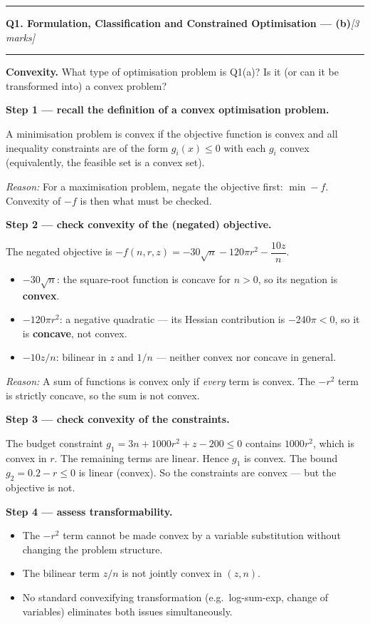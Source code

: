 \documentclass[10pt,a4paper]{article}
\newcommand{\sectitle}[2]{%
  \vspace{10pt}\noindent\rule{\linewidth}{0.8pt}\par\vspace{2pt}%
  {\large\textbf{#1}\hfill\normalsize\textit{[#2 marks]}}\par
  \vspace{2pt}\rule{\linewidth}{0.4pt}\vspace{4pt}}
\newcommand{\reason}[1]{%
  \begin{mdframed}[backgroundcolor=reasonbg, linewidth=0.4pt,
    innertopmargin=3pt, innerbottommargin=3pt,
    innerleftmargin=6pt, innerrightmargin=6pt]
    \small\textit{Reason:} \small #1
  \end{mdframed}\vspace{2pt}}
\begin{document}
\sectitle{Q1. Formulation, Classification and Constrained Optimisation --- (b)}{3}

\noindent\textbf{Convexity.} What type of optimisation problem is Q1(a)?
Is it (or can it be transformed into) a convex problem?

\vspace{6pt}
\textbf{Step 1 --- recall the definition of a convex optimisation problem.}

A minimisation problem is convex if the objective function is convex and
all inequality constraints are of the form $g_i(x)\le 0$ with each $g_i$
convex (equivalently, the feasible set is a convex set).

\reason{For a maximisation problem, negate the objective first: $\min -f$.
        Convexity of $-f$ is then what must be checked.}

\textbf{Step 2 --- check convexity of the (negated) objective.}

The negated objective is $-f(n,r,z) = -30\sqrt{n} - 120\pi r^2 - \dfrac{10z}{n}$.

\begin{itemize}[noitemsep]
  \item $-30\sqrt{n}$: the square-root function is concave for $n>0$,
        so its negation is \textbf{convex}.
  \item $-120\pi r^2$: a negative quadratic --- its Hessian contribution
        is $-240\pi < 0$, so it is \textbf{concave}, not convex.
  \item $-10z/n$: bilinear in $z$ and $1/n$ --- neither convex nor
        concave in general.
\end{itemize}

\reason{A sum of functions is convex only if \emph{every} term is convex.
        The $-r^2$ term is strictly concave, so the sum is not convex.}

\textbf{Step 3 --- check convexity of the constraints.}

The budget constraint $g_1 = 3n + 1000r^2 + z - 200 \le 0$ contains
$1000r^2$, which is convex in $r$. The remaining terms are linear.
Hence $g_1$ is convex. The bound $g_2 = 0.2 - r \le 0$ is linear
(convex). So the constraints are convex --- but the objective is not.

\textbf{Step 4 --- assess transformability.}

\begin{itemize}[noitemsep]
  \item The $-r^2$ term cannot be made convex by a variable
        substitution without changing the problem structure.
  \item The bilinear term $z/n$ is not jointly convex in $(z,n)$.
  \item No standard convexifying transformation (e.g.\ log-sum-exp,
        change of variables) eliminates both issues simultaneously.
\end{itemize}
\end{document}
